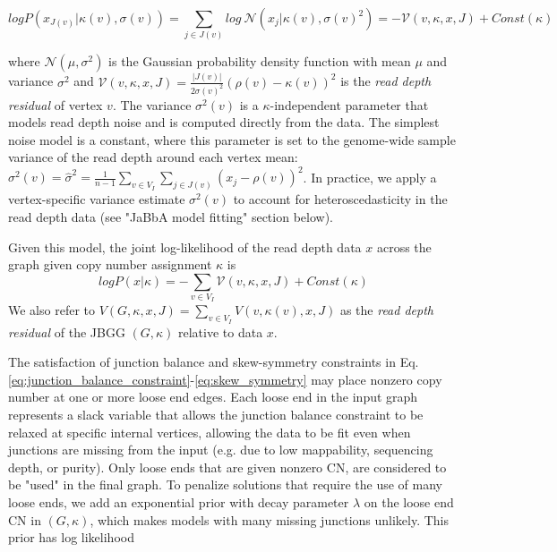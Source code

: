 \documentclass[phd,tocprelim]{cornell}
\begin{document}
\begin{equation} \label{eq:nodeloglikelihood}
    log P(x_{J(v)} | \kappa(v), \sigma(v)) =  \sum_{j \in J(v)} log \ \mathcal{N}(x_j | \kappa(v), \sigma(v)^2) = - \mathcal{V}(v, \kappa, x, J) + Const(\kappa)
\end{equation}

where $\mathcal{N}(\mu, \sigma^2)$ is the Gaussian probability density function with mean $\mu$ and variance $\sigma^2$ and $\mathcal{V}(v, \kappa, x, J) =  \frac{|J(v)|}{2\sigma(v)^2}(\rho(v)- \kappa(v))^2$ is the \textit{read depth residual} of vertex $v$. The variance $\sigma^2(v)$ is a $\kappa$-independent parameter that models read depth noise and is computed directly from the data.  The simplest noise model is a constant, where this parameter is set to the genome-wide sample variance of the read depth around each vertex mean: $\sigma^2(v) = \hat{\sigma}^2 = \frac{1}{n-1} \sum_{v \in V_I} \sum_{j \in J(v)} (x_j - \rho(v))^2$.  In practice, we apply a vertex-specific variance estimate $\sigma^2(v)$ to account for heteroscedasticity in the read depth data (see "JaBbA model fitting" section below).

Given this model, the joint log-likelihood of the read depth data $x$ across the graph given copy number assignment $\kappa$ is
\begin{equation} \label{eq:jointloglikelihood}
    log P(x | \kappa) = - \sum_{v \in V_I} \mathcal{V}(v, \kappa, x, J) + Const(\kappa)
\end{equation}
We also refer to $V(G, \kappa, x, J) = \sum_{v\in V_I} V(v, \kappa(v), x, J)$ as the \textit{read depth residual} of the JBGG $(G, \kappa)$ relative to data $x$.

The satisfaction of junction balance and skew-symmetry constraints in Eq. \ref{eq:junction_balance_constraint}-\ref{eq:skew_symmetry} may place nonzero copy number at one or more loose end edges.   Each loose end in the input graph represents a slack variable that allows the junction balance constraint to be relaxed at specific internal vertices, allowing the data to be fit even when junctions are missing from the input (e.g. due to low mappability, sequencing depth, or purity).  Only loose ends that are given nonzero CN, are considered to be "used" in the final graph. To penalize solutions that require the use of many loose ends, we add an exponential prior with decay parameter $\lambda$ on the loose end CN in $(G, \kappa)$, which makes models with many missing junctions unlikely.  This prior has log likelihood
\end{document}
